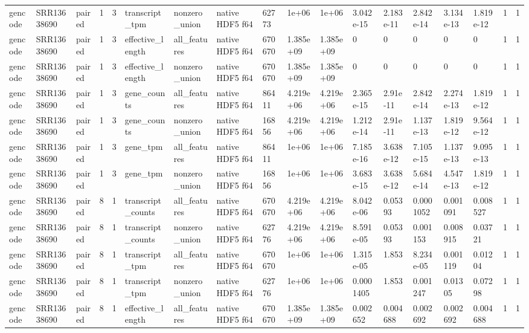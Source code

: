 \begin{tabular}{llllllllllllllllll}
gencode & SRR13638690 & paired & 1 & 3 & transcript\_tpm & nonzero\_union & native HDF5 f64 & 62773 & 1e+06 & 1e+06 & 3.042e-15 & 2.183e-11 & 2.842e-14 & 3.134e-13 & 1.819e-12 & 1 & 1 \\
gencode & SRR13638690 & paired & 1 & 3 & effective\_length & all\_features & native HDF5 f64 & 670670 & 1.385e+09 & 1.385e+09 & 0 & 0 & 0 & 0 & 0 & 1 & 1 \\
gencode & SRR13638690 & paired & 1 & 3 & effective\_length & nonzero\_union & native HDF5 f64 & 670670 & 1.385e+09 & 1.385e+09 & 0 & 0 & 0 & 0 & 0 & 1 & 1 \\
gencode & SRR13638690 & paired & 1 & 3 & gene\_counts & all\_features & native HDF5 f64 & 86411 & 4.219e+06 & 4.219e+06 & 2.365e-15 & 2.91e-11 & 2.842e-14 & 2.274e-13 & 1.819e-12 & 1 & 1 \\
gencode & SRR13638690 & paired & 1 & 3 & gene\_counts & nonzero\_union & native HDF5 f64 & 16856 & 4.219e+06 & 4.219e+06 & 1.212e-14 & 2.91e-11 & 1.137e-13 & 1.819e-12 & 9.564e-12 & 1 & 1 \\
gencode & SRR13638690 & paired & 1 & 3 & gene\_tpm & all\_features & native HDF5 f64 & 86411 & 1e+06 & 1e+06 & 7.185e-16 & 3.638e-12 & 7.105e-15 & 1.137e-13 & 9.095e-13 & 1 & 1 \\
gencode & SRR13638690 & paired & 1 & 3 & gene\_tpm & nonzero\_union & native HDF5 f64 & 16856 & 1e+06 & 1e+06 & 3.683e-15 & 3.638e-12 & 5.684e-14 & 4.547e-13 & 1.819e-12 & 1 & 1 \\
gencode & SRR13638690 & paired & 8 & 1 & transcript\_counts & all\_features & native HDF5 f64 & 670670 & 4.219e+06 & 4.219e+06 & 8.042e-06 & 0.05393 & 0.0001052 & 0.001091 & 0.008527 & 1 & 1 \\
gencode & SRR13638690 & paired & 8 & 1 & transcript\_counts & nonzero\_union & native HDF5 f64 & 62776 & 4.219e+06 & 4.219e+06 & 8.591e-05 & 0.05393 & 0.001153 & 0.008915 & 0.03721 & 1 & 1 \\
gencode & SRR13638690 & paired & 8 & 1 & transcript\_tpm & all\_features & native HDF5 f64 & 670670 & 1e+06 & 1e+06 & 1.315e-05 & 1.853 & 8.234e-05 & 0.001119 & 0.01204 & 1 & 1 \\
gencode & SRR13638690 & paired & 8 & 1 & transcript\_tpm & nonzero\_union & native HDF5 f64 & 62776 & 1e+06 & 1e+06 & 0.0001405 & 1.853 & 0.001247 & 0.01305 & 0.07298 & 1 & 1 \\
gencode & SRR13638690 & paired & 8 & 1 & effective\_length & all\_features & native HDF5 f64 & 670670 & 1.385e+09 & 1.385e+09 & 0.002652 & 0.004688 & 0.002692 & 0.002692 & 0.004688 & 1 & 1 \\

\end{tabular}

